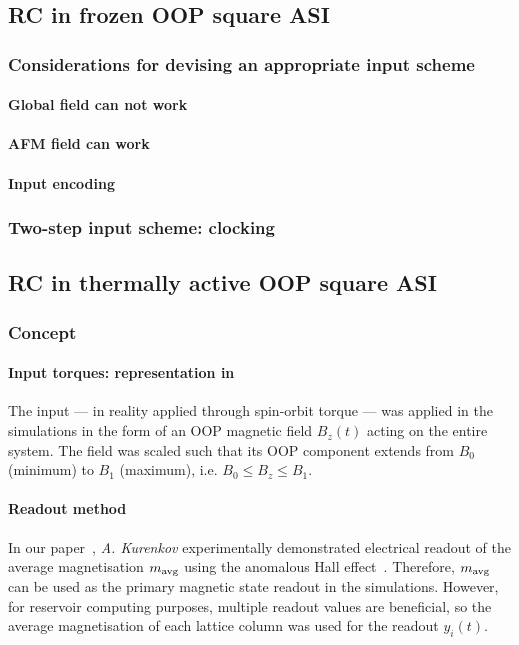 \subsection{RC in frozen OOP square ASI}
\subsubsection{Considerations for devising an appropriate input scheme}
\paragraph{Global field can not work} %
\paragraph{AFM field can work}
\paragraph{Input encoding} %
\subsubsection{Two-step input scheme: clocking} %

\subsection{RC in thermally active OOP square ASI}
\subsubsection{Concept} %
\paragraph{Input torques: representation in \hotspice}
The input --- in reality applied through spin-orbit torque --- was applied in the simulations in the form of an OOP magnetic field $B_z(t)$ acting on the entire system.
The field was scaled such that its OOP component extends from $B_0$ (minimum) to $B_1$ (maximum), i.e. $B_0 \leq B_z \leq B_1$.

\paragraph{Readout method}
In our paper~\cite{KUR-24}, \textit{A. Kurenkov} experimentally demonstrated electrical readout of the average magnetisation $m_\mathrm{avg}$ using the anomalous Hall effect~\cite{AHE}.
Therefore, $m_\mathrm{avg}$ can be used as the primary magnetic state readout in the simulations.
However, for reservoir computing purposes, multiple readout values are beneficial, so the average magnetisation of each lattice column was used for the readout $y_i(t)$. %

